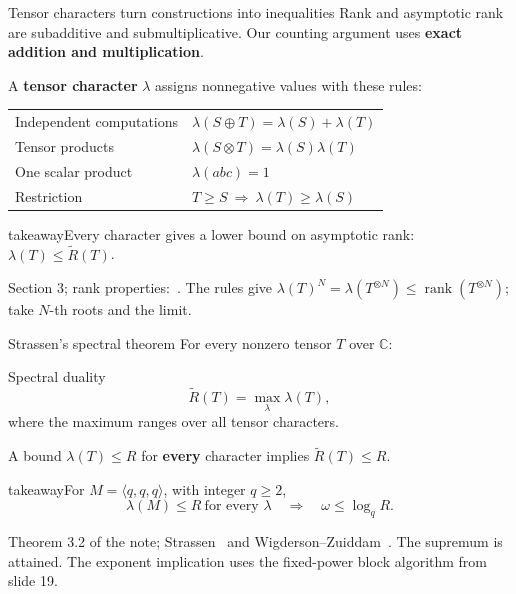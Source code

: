 \documentclass[aspectratio=169,11pt]{beamer}
\newcommand{\CC}{\mathbb C}
\newcommand{\rank}{\operatorname{rank}}
\newcommand{\cmm}[3]{\langle #1,#2,#3\rangle}
\newcommand{\source}[1]{\vfill\par{\fontsize{7.5}{9}\selectfont\color{muted}#1\par}}
\newcommand{\takeaway}[1]{\begin{beamercolorbox}[sep=0.65em,wd=\linewidth]{takeaway}#1\end{beamercolorbox}}
\begin{document}
\begin{frame}{Tensor characters turn constructions into inequalities}
  Rank and asymptotic rank are subadditive and submultiplicative.
  Our counting argument uses \textbf{exact addition and multiplication}.
  \par\medskip
  A \textbf{tensor character} $\lambda$ assigns nonnegative values with these rules:
  \par\medskip
  \begin{center}
    \renewcommand{\arraystretch}{1.5}
    \begin{tabular}{@{}ll@{}}
      Independent computations & $\lambda(S\oplus T)=\lambda(S)+\lambda(T)$\\
      Tensor products & $\lambda(S\otimes T)=\lambda(S)\lambda(T)$\\
      One scalar product & $\lambda(abc)=1$\\
      Restriction & $T\ge S\ \Longrightarrow\ \lambda(T)\ge\lambda(S)$
    \end{tabular}
  \end{center}
  \medskip
  \takeaway{Every character gives a lower bound on asymptotic rank:
    $\displaystyle\lambda(T)\le\widetilde R(T)$.}
  \source{Section 3; rank properties:~\cite[Section 4.1]{spectra}.
  The rules give $\lambda(T)^N=\lambda(T^{\otimes N})\le\rank(T^{\otimes N})$;
  take $N$-th roots and the limit.}
\end{frame}

\begin{frame}{Strassen's spectral theorem}
  For every nonzero tensor $T$ over $\CC$:
  \begin{block}{Spectral duality}
    \[
      \widetilde R(T)=\max_{\lambda}\lambda(T),
    \]
    where the maximum ranges over all tensor characters.
  \end{block}
  \medskip
  A bound $\lambda(T)\le R$ for \textbf{every} character implies
  $\widetilde R(T)\le R$.
  \par\medskip
  \takeaway{For $M=\cmm{q}{q}{q}$, with integer $q\ge2$,
    \[
      \lambda(M)\le R\ \text{for every }\lambda
        \quad\Longrightarrow\quad\omega\le\log_q R.
    \]}
  \source{Theorem 3.2 of the note; Strassen~\cite[Theorem 3.8]{strassen} and
  Wigderson--Zuiddam~\cite[Corollary 3.30, author version]{spectra}.
  The supremum is attained. The exponent implication uses the fixed-power
  block algorithm from slide 19.}
\end{frame}
\end{document}
